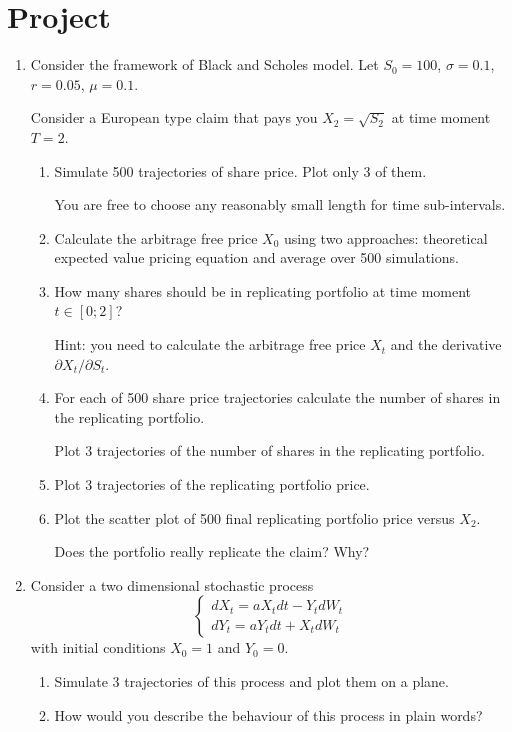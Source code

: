 \documentclass[12pt]{article}
\begin{document}
\section*{Project}

\begin{enumerate}

\item Consider the framework of Black and Scholes model.
Let $S_0 =100$, $\sigma = 0.1$, $r=0.05$, $\mu = 0.1$. 

Consider a European type claim that pays you $X_2 = \sqrt{S_2}$ at time moment $T=2$. 

\begin{enumerate}
    \item Simulate 500 trajectories of share price. Plot only 3 of them.
    
    You are free to choose any reasonably small length for time sub-intervals. 

    \item Calculate the arbitrage free price $X_0$ using two approaches:
    theoretical expected value pricing equation and average over 500 simulations. 

    \item How many shares should be in replicating portfolio at time moment $t \in [0;2]$?
    
    Hint: you need to calculate the arbitrage free price $X_t$ and the derivative $\partial X_t/\partial S_t$. 

    \item For each of 500 share price trajectories calculate the number of shares in the replicating portfolio. 
    
    Plot 3 trajectories of the number of shares in the replicating portfolio. 
    
    \item Plot 3 trajectories of the replicating portfolio price. 
    
    \item Plot the scatter plot of 500 final replicating portfolio price versus $X_2$.
    
    Does the portfolio really replicate the claim? Why?
\end{enumerate}

\item Consider a two dimensional stochastic process
\[
    \begin{cases}
    dX_t=aX_t dt-Y_t dW_t \\
    dY_t=aY_t dt+X_t dW_t
    \end{cases}
\]
with initial conditions $X_0=1$ and $Y_0=0$.

\begin{enumerate}
    \item Simulate 3 trajectories of this process and plot them on a plane. 
    \item How would you describe the behaviour of this process in plain words?
\end{enumerate}



    
\end{enumerate}
\end{document}
